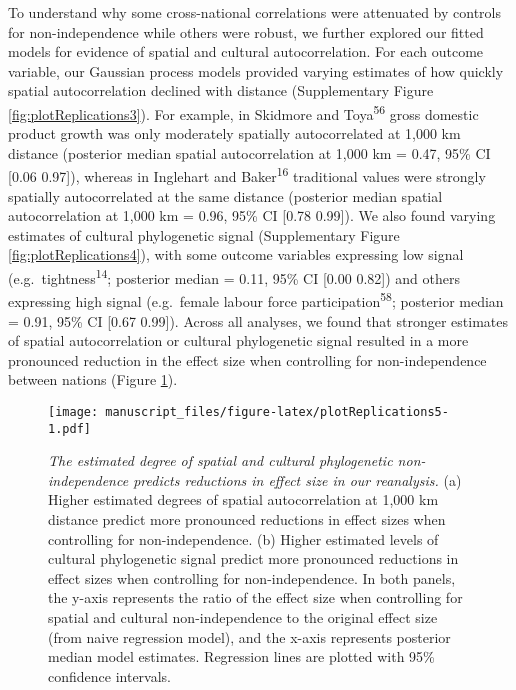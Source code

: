\documentclass[english,man,floatsintext]{apa6}
\begin{document}
To understand why some cross-national correlations were attenuated by controls for non-independence while others were robust, we further explored our fitted models for evidence of spatial and cultural autocorrelation. For each outcome variable, our Gaussian process models provided varying estimates of how quickly spatial autocorrelation declined with distance (Supplementary Figure \ref{fig:plotReplications3}). For example, in Skidmore and Toya\textsuperscript{56} gross domestic product growth was only moderately spatially autocorrelated at 1,000 km distance (posterior median spatial autocorrelation at 1,000 km = 0.47, 95\% CI {[}0.06 0.97{]}), whereas in Inglehart and Baker\textsuperscript{16} traditional values were strongly spatially autocorrelated at the same distance (posterior median spatial autocorrelation at 1,000 km = 0.96, 95\% CI {[}0.78 0.99{]}). We also found varying estimates of cultural phylogenetic signal (Supplementary Figure \ref{fig:plotReplications4}), with some outcome variables expressing low signal (e.g.~tightness\textsuperscript{14}; posterior median = 0.11, 95\% CI {[}0.00 0.82{]}) and others expressing high signal (e.g.~female labour force participation\textsuperscript{58}; posterior median = 0.91, 95\% CI {[}0.67 0.99{]}). Across all analyses, we found that stronger estimates of spatial autocorrelation or cultural phylogenetic signal resulted in a more pronounced reduction in the effect size when controlling for non-independence between nations (Figure \ref{fig:plotReplications5}).



\begin{figure}
\centering
\texttt{[image: manuscript\_files/figure-latex/plotReplications5-1.pdf]}
\caption{\label{fig:plotReplications5}\emph{The estimated degree of spatial and cultural phylogenetic non-independence predicts reductions in effect size in our reanalysis.} (a) Higher estimated degrees of spatial autocorrelation at 1,000 km distance predict more pronounced reductions in effect sizes when controlling for non-independence. (b) Higher estimated levels of cultural phylogenetic signal predict more pronounced reductions in effect sizes when controlling for non-independence. In both panels, the y-axis represents the ratio of the effect size when controlling for spatial and cultural non-independence to the original effect size (from naive regression model), and the x-axis represents posterior median model estimates. Regression lines are plotted with 95\% confidence intervals.}
\end{figure}
\end{document}
